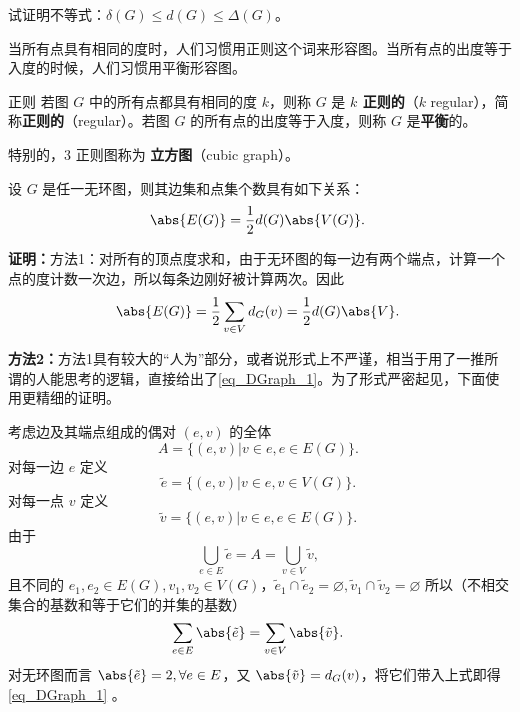 \begin{exercise}{}
试证明不等式：$\delta(G)\leq d(G)\leq \Delta(G)$。
\end{exercise}


当所有点具有相同的度时，人们习惯用正则这个词来形容图。当所有点的出度等于入度的时候，人们习惯用平衡形容图。
\begin{definition}{正则}
若图 $G$ 中的所有点都具有相同的度 $k$，则称 $G$ 是 \textbf{$k$ 正则的}（$k$ regular），简称\textbf{正则的}（regular）。若图 $G$ 的所有点的出度等于入度，则称 $G$ 是\textbf{平衡}的。

特别的，$3$ 正则图称为 \textbf{立方图}（cubic graph）。
\end{definition}

\begin{theorem}{}\label{the_DGraph_1}
设 $G$ 是任一无环图，则其边集和点集个数具有如下关系：
\begin{equation}\label{eq_DGraph_3}
\abs{E(G)}=\frac{1}{2}d(G)\abs{V(G)}.~
\end{equation}
\end{theorem}
\textbf{证明：}方法1：对所有的顶点度求和，由于无环图的每一边有两个端点，计算一个点的度计数一次边，所以每条边刚好被计算两次。因此
\begin{equation}\label{eq_DGraph_1}
\abs{E(G)}=\frac{1}{2}\sum_{v\in V}d_G(v)=\frac{1}{2}d(G)\abs{V}.~
\end{equation}

\textbf{方法2：}方法1具有较大的“人为”部分，或者说形式上不严谨，相当于用了一推所谓的人能思考的逻辑，直接给出了\autoref{eq_DGraph_1}。为了形式严密起见，下面使用更精细的证明。

考虑边及其端点组成的偶对 $(e,v)$ 的全体
\begin{equation}
A=\{(e,v)|v\in e,e\in E(G)\}.~
\end{equation}
对每一边 $e$ 定义
\begin{equation}
\tilde e=\{(e,v)|v\in e,v\in V(G)\}.~
\end{equation}
对每一点 $v$ 定义
\begin{equation}
\tilde v=\{(e,v)|v\in e,e\in E(G)\}.~
\end{equation}
由于 
\begin{equation}
\bigcup_{e\in E}\tilde e=A=\bigcup_{v\in V}\tilde v,~
\end{equation}
且不同的 $e_1,e_2\in E(G),v_1,v_2\in V(G)$，$\tilde e_1\cap\tilde e_2=\varnothing,\tilde v_1\cap\tilde v_2=\varnothing$
所以（不相交集合的基数和等于它们的并集的基数）
\begin{equation}
\sum_{e\in E}\abs{\tilde e}=\sum_{v\in V}\abs{\tilde v}.~
\end{equation}
对无环图而言 $\abs{\tilde e}=2,\forall e\in E$，又 $\abs{\tilde v}=d_G(v)$，将它们带入上式即得\autoref{eq_DGraph_1} 。

